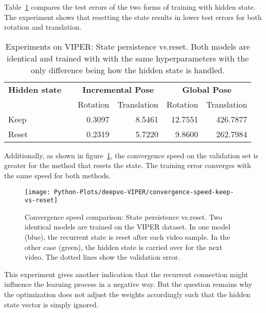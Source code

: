 		Table~\ref{tbl:viper-state-reset-vs-keep} compares the test errors of the two forms of training with hidden state.
		The experiment shows that resetting the state results in lower test errors for both rotation and translation.
		\begin{table}[tb]
			\small
			\begin{center}
				\begin{tabular}{lcrrrr}
					\toprule
					\textbf{Hidden state} & & \multicolumn{2}{c}{\textbf{Incremental Pose}} & \multicolumn{2}{c}{\textbf{Global Pose}} \\
					& & Rotation & Translation & Rotation & Translation \\
					\midrule
					Keep		&			& 0.3097	& 8.5461	& 12.7551	& 426.7877		\\
					Reset 		& 			& 0.2319	& 5.7220	& 9.8600	& 262.7984		\\ 
					\bottomrule
				\end{tabular}
			\end{center}
			\caption[Experiments on VIPER: State persistence vs.\@ reset]
					{Experiments on VIPER: State persistence vs.\@ reset.
					 Both models are identical and trained with with the same hyperparameters with the only difference being how the hidden state is handled.
					 \label{tbl:viper-state-reset-vs-keep}}
		\end{table}
		Additionally, as shown in figure~\ref{fig:viper-convergence-speed-state-reset-vs-keep}, the convergence speed on the validation set is greater for the method that resets the state.
		The training error converges with the same speed for both methods. 
		\begin{figure}[t]
			\centering
			\texttt{[image: Python-Plots/deepvo-VIPER/convergence-speed-keep-vs-reset]}
			\caption[Convergence speed comparison: State persistence vs.\@ reset]
					{Convergence speed comparison: State persistence vs.\@ reset.
					 Two identical models are trained on the VIPER dataset.
					 In one model (blue), the recurrent state is reset after each video sample.
					 In the other case (green), the hidden state is carried over for the next video.
					 The dotted lines show the validation error.
					 \label{fig:viper-convergence-speed-state-reset-vs-keep}}
		\end{figure}
		This experiment gives another indication that the recurrent connection might influence the learning process in a negative way.
		But the question remains why the optimization does not adjust the weights accordingly such that the hidden state vector is simply ignored.
		
